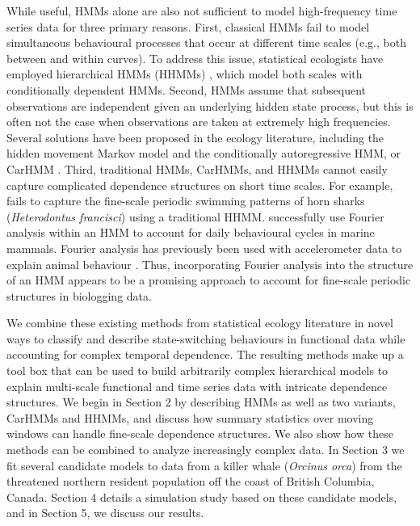 While useful, HMMs alone are also not sufficient to model high-frequency time series data for three primary reasons.
First, classical HMMs fail to model simultaneous behavioural processes that occur at different time scales (e.g., both between and within curves). To address this issue, statistical ecologists have employed hierarchical HMMs (HHMMs) \citep{Barajas:2017,Adam:2019}, which model both scales with conditionally dependent HMMs.
Second, HMMs assume that subsequent observations are independent given an underlying hidden state process, but this is often not the case when observations are taken at extremely high frequencies. Several solutions have been proposed in the ecology literature, including the hidden movement Markov model \citep{Whoriskey:2016} and the conditionally autoregressive HMM, or CarHMM \citep{Lawler:2019}. 
Third, traditional HMMs, CarHMMs, and HHMMs cannot easily capture complicated dependence structures on short time scales. For example, \citet{Adam:2019} fails to capture the fine-scale periodic swimming patterns of horn sharks (\textit{Heterodontus francisci}) using a traditional HHMM. \citet{Heerah:2017} successfully use Fourier analysis within an HMM to account for daily behavioural cycles in marine mammals. Fourier analysis has previously been used with accelerometer data to explain animal behaviour \citep{Fehlmann:2017,Shorter:2017}. Thus, incorporating Fourier analysis into the structure of an HMM appears to be a promising approach to account for fine-scale periodic structures in biologging data.

We combine these existing methods from statistical ecology literature in novel ways to classify and describe state-switching behaviours in functional data while accounting for complex temporal dependence. The resulting methods make up a tool box that can be used to build arbitrarily complex hierarchical models to explain multi-scale functional and time series data with intricate dependence structures.
We begin in Section 2 by describing HMMs as well as two variants, CarHMMs and HHMMs, and discuss how summary statistics over moving windows can handle fine-scale dependence structures. We also show how these methods can be combined to analyze increasingly complex data. In Section 3 we fit several candidate models to data from a killer whale (\textit{Orcinus orca}) from the threatened northern resident population off the coast of British Columbia, Canada. Section 4 details a simulation study based on these candidate models, and in Section 5, we discuss our results.